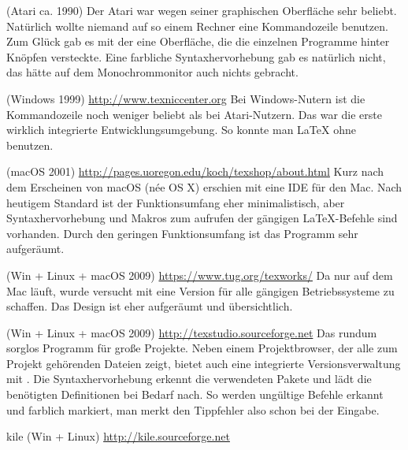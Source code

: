 \begin{labeling}{}
\item[\Program{TeXShell}] (Atari ca. 1990) Der Atari war wegen seiner graphischen Oberfläche sehr beliebt.
Natürlich wollte niemand auf so einem Rechner eine Kommandozeile benutzen.
Zum Glück gab es mit der  eine Oberfläche, die die einzelnen Programme hinter
Knöpfen versteckte.
Eine farbliche Syntaxhervorhebung gab es natürlich nicht, das hätte auf dem Monochrommonitor
auch nichts gebracht.

\item[\Program{TexnicCenter}] (Windows 1999) \url{http://www.texniccenter.org}  Bei Windows-Nutern ist
die Kommandozeile noch weniger beliebt als bei Atari-Nutzern.
Das  war die erste wirklich integrierte Entwicklungsumgebung.
So konnte man \LaTeX{} ohne  benutzen.

\item[\Program{Texshop}] (macOS 2001) \url{http://pages.uoregon.edu/koch/texshop/about.html}  Kurz nach dem 
Erscheinen von macOS (née OS X) erschien mit  eine IDE für den Mac.
Nach heutigem Standard ist der Funktionsumfang eher minimalistisch, aber Syntaxhervorhebung und
Makros zum aufrufen der gängigen \LaTeX{}-Befehle sind vorhanden.
Durch den geringen Funktionsumfang ist das Programm sehr aufgeräumt.

\item[\Program{TeXworks}] (Win + Linux + macOS 2009) \url{https://www.tug.org/texworks/}  Da 
nur auf dem Mac läuft, wurde versucht mit  eine Version für alle gängigen
Betriebssysteme zu schaffen.
Das Design ist eher aufgeräumt und übersichtlich.

\item[\Program{TeXStudio}] (Win + Linux + macOS 2009) \url{http://texstudio.sourceforge.net}  Das rundum sorglos
Programm für große Projekte. Neben einem Projektbrowser, der alle zum Projekt gehörenden Dateien zeigt,
bietet  auch eine integrierte Versionsverwaltung mit .
Die Syntaxhervorhebung erkennt die verwendeten Pakete und lädt die benötigten Definitionen bei Bedarf nach.
So werden ungültige Befehle erkannt und farblich markiert, man merkt den Tippfehler also schon bei der Eingabe.

\item[kile] (Win + Linux) \url{http://kile.sourceforge.net}

\end{labeling}

